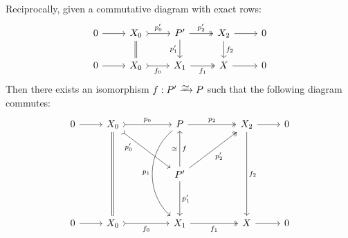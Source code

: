\begin{theorem}
\begin{enumerate}[(a)]
              Reciprocally, given a commutative diagram with exact rows:
              \[
                  \begin{tikzcd}
                      0 \ar[r]
                      &X_0
                      \ar[d, equals]
                      \ar[r, "p_0'", tail]
                      &P'
                      \ar[r, "p_2'", two heads]
                      \ar[d, "p_1'"']
                      &X_2
                      \ar[d, "f_2"]
                      \ar[r]
                      &0 \\
                      0 \ar[r]
                      &X_0 \ar[r, tail, "f_0"']
                      &X_1 \ar[r, two heads, "f_1"']
                      &X \ar[r]
                      &0
                  \end{tikzcd}
              \]
              Then there exists an isomorphism \(f: P' \isoto P\) such that the following
              diagram commutes:
              \[
                  \begin{tikzcd}
                      0
                      \ar[r]
                      &X_0
                      \ar[dddd, equals]
                      \ar[rr, "p_0", tail]
                      \ar[rrdd, "p_0'"', near start, tail, crossing over]
                      &
                      &P
                      \ar[rr, "p_2", two heads]
                      \ar[dddd, "p_1"', bend right=50]
                      &
                      &X_2
                      \ar[dddd, "f_2"]
                      \ar[r]
                      &0
                      \\
                      &
                      &
                      &
                      &
                      &
                      &
                      \\
                      &
                      &
                      &P'
                      \ar[uu, "f"', "\dis"]
                      \ar[uurr, "p_2'"', two heads]
                      \ar[dd, "p_1'"]
                      &
                      &
                      &
                      \\
                      &
                      &
                      &
                      &
                      \\
                      0
                      \ar[r]
                      &X_0
                      \ar[rr, tail, "f_0"']
                      &
                      &X_1
                      \ar[rr, two heads, "f_1"']
                      &
                      &X
                      \ar[r]
                      &0
                  \end{tikzcd}
              \]



\end{enumerate}
\end{theorem}
